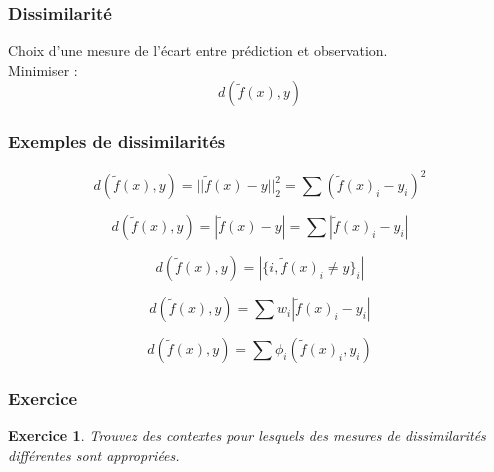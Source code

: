 \documentclass[11pt]{beamer}
\newenvironment{slide}[1]{%
\begin{frame}[environment=slide]
\frametitle{#1}
}{%
\end{frame}
}
\newtheorem{exercice}{Exercice}
\begin{document}
\begin{slide}{Dissimilarité}

Choix d'une mesure de l'écart entre prédiction et observation.\\
\pause
Minimiser :
$$d(\tilde{f}(x),y)$$

\end{slide}

\begin{slide}{Exemples de dissimilarités}

$$d(\tilde{f}(x),y) = ||\tilde{f}(x)-y||_2^2 = \sum (\tilde{f}(x)_i-y_i)^2 $$

$$d(\tilde{f}(x),y) = |\tilde{f}(x)-y| = \sum |\tilde{f}(x)_i-y_i| $$

$$d(\tilde{f}(x),y) = |\{i,\tilde{f}(x)_i \neq y\}_i| $$

$$d(\tilde{f}(x),y) = \sum w_i|\tilde{f}(x)_i-y_i| $$

$$d(\tilde{f}(x),y) = \sum \phi_i(\tilde{f}(x)_i,y_i) $$

\end{slide}

\begin{slide}{Exercice}

\begin{exercice}
Trouvez des contextes pour lesquels des mesures de dissimilarités différentes sont appropriées.
\end{exercice}

\end{slide}
\end{document}
